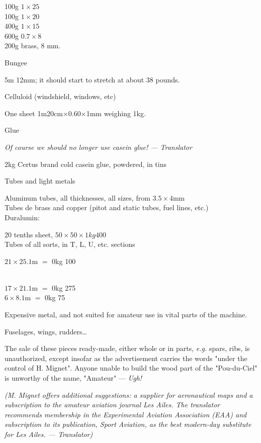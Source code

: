 \documentclass{book}
\begin{document}
{{  100g $1\times25$\\
  100g $1\times20$\\
  400g $1\times15$\\
  600g $0.7\times8$\\
  200g brass, 8 mm.

\item{Bungee}

  5m 12mm; it should start to stretch at about 38 pounds.

\item{Celluloid (windshield, windows, etc)}

  One sheet 1m20cm$\times$0.60$\times$1mm weighing 1kg.

\item{Glue}

  \textit{Of course we should no longer use casein glue! --- Translator}

  2kg Certus brand cold casein glue, powdered, in tins

\item{Tubes and light metals}

  Aluminum tubes, all thicknesses, all sizes, from $3.5\times4$mm\\
  Tubes de brass and copper (pitot and static tubes, fuel lines, etc.)\\
  
  Duralumin:

  20 tenths sheet, $50\times50\times1kg400$\\
  Tubes of all sorts, in T, L, U, etc. sections

  $21\times25.1$m $=$ 0kg 100}\\
  $17\times21.1$m $=$ 0kg 275\\
  $6\times8.1$m $=$ 0kg 75

  Expensive metal, and not suited for amateur use in vital parts of
  the machine.

\item{Fuselages, wings, rudders\ldots}

  The sale of these pieces ready-made, either whole or in parts,
  \textit{e.g.} spars, ribs, is unauthorized, except insofar as the
  advertisement carries the words "under the control of
  H. Mignet". Anyone unable to build the wood part of the
  "Pou-du-Ciel" is unworthy of the name, "Amateur" --- \textit{Ugh!}

\textit{(M. Mignet offers additional suggestions: a supplier for
  aeronautical maps and a subscription to the amateur aviation journal
  \guillemotleft Les Ailes\guillemotright.  The translator recommends membership in the
  Experimental Aviation Association (EAA) and subscription to its
  publication, Sport Aviation, as the best modern-day substitute for
  \guillemotleft Les Ailes\guillemotright. --- Translator)}

}
\end{document}
